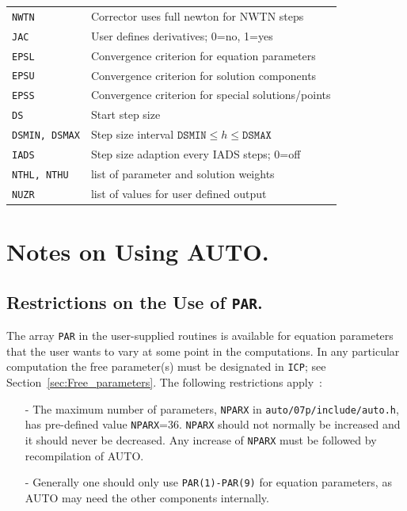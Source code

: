 \documentclass[12pt]{report}
\begin{document}
\begin{tabular}{|l|l|}
{\tt NWTN} & Corrector uses full newton for NWTN steps \\
{\tt JAC}  & User defines derivatives; 0=no, 1=yes \\
\hline
{\tt EPSL} & Convergence criterion for equation parameters \\
{\tt EPSU} & Convergence criterion for solution components \\
{\tt EPSS} & Convergence criterion for special solutions/points \\
\hline
{\tt DS}  & Start step size \\
{\tt DSMIN, DSMAX} & Step size interval $\mathtt{DSMIN} \leq h \leq \mathtt{DSMAX}$ \\
{\tt IADS} & Step size adaption every IADS steps; 0=off \\
\hline
{\tt NTHL, NTHU} & list of parameter and solution weights \\
\hline
{\tt NUZR} & list of values for user defined output\\
\hline
\end{tabular}

 

\chapter{ Notes on Using {\cal AUTO}.}  \label{ch:Notes_on_Using_AUTO}
\section{ Restrictions on the Use of {\tt PAR}.} \label{sec:Restrictions_on_PAR}
The array {\tt PAR} in the user-supplied routines is available
for equation parameters that the user wants to vary at some point
in the computations.
In any particular computation the free parameter(s) must be designated
in {\tt ICP}; see Section~\ref{sec:Free_parameters}.
The following restrictions apply~:

\begin{itemize}
\item[-]
  The maximum number of parameters, {\tt NPARX} in {\tt auto/07p/include/auto.h},
  has pre-defined value {\tt NPARX}=36.  {\tt NPARX} should not normally be increased
  and it should never be decreased.
  Any increase of {\tt NPARX} must be followed by recompilation of {\cal AUTO}.
\item[-]
  Generally one should only use {\tt PAR(1)-PAR(9)} for equation parameters,
  as {\cal AUTO} may need the other components internally.  
\end{itemize}
\end{document}
